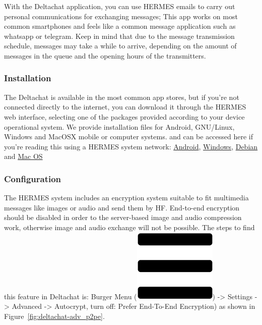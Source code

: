 \documentclass[11pt,a4paper]{article}
\begin{document}
With the Deltachat application, you can use HERMES emails to carry out personal communications for exchanging messages; This app works on most common smartphones and feels like a common message application such as whatsapp or telegram. Keep in mind that due to the message transmission schedule, messages may take a while to arrive, depending on the amount of messages in the queue and the opening hours of the transmitters.

\subsubsection{Installation}

The Deltachat is available in the most common app stores, but if you're not connected directly to the internet, you can download it through the HERMES web interface, selecting one of the packages provided according to your device operational system. We provide installation files for Android, GNU/Linux, Windows and MacOSX mobile or computer systems. and can be accessed here if you're reading this using a HERMES system network: \href{ http://10.0.0.1/dowloads/deltachat.apk}{Android},  \href{ http://10.0.0.1/dowloads/deltachat.exe}{Windows},  \href{ http://10.0.0.1/dowloads/deltachat.deb}{Debian} and \href{http://10.0.0.1/dowloads/deltachat.dmg}{Mac OS}


\subsubsection{Configuration}

The HERMES system includes an encryption system suitable to fit multimedia messages like images or audio and send them by HF.  End-to-end encryption should be disabled in order to the server-based image and audio compression work, otherwise image and audio exchange will not be possible.
The steps to find this feature in Deltachat is: Burger Menu (\includegraphics[height=0.78\baselineskip]{pictures/burger.png}) -> Settings -> Advanced -> Autocrypt, turn off: Prefer End-To-End Encryption) as shown in Figure~\ref{fig:deltachat-adv_p2pe}.
\end{document}
